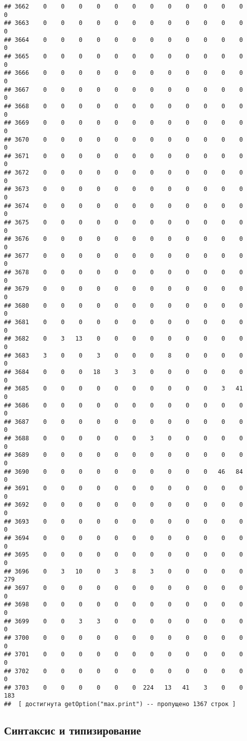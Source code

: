 \documentclass[]{article}
\begin{document}
\begin{verbatim}
## 3662    0    0    0    0    0    0    0    0    0    0    0    0    0
## 3663    0    0    0    0    0    0    0    0    0    0    0    0    0
## 3664    0    0    0    0    0    0    0    0    0    0    0    0    0
## 3665    0    0    0    0    0    0    0    0    0    0    0    0    0
## 3666    0    0    0    0    0    0    0    0    0    0    0    0    0
## 3667    0    0    0    0    0    0    0    0    0    0    0    0    0
## 3668    0    0    0    0    0    0    0    0    0    0    0    0    0
## 3669    0    0    0    0    0    0    0    0    0    0    0    0    0
## 3670    0    0    0    0    0    0    0    0    0    0    0    0    0
## 3671    0    0    0    0    0    0    0    0    0    0    0    0    0
## 3672    0    0    0    0    0    0    0    0    0    0    0    0    0
## 3673    0    0    0    0    0    0    0    0    0    0    0    0    0
## 3674    0    0    0    0    0    0    0    0    0    0    0    0    0
## 3675    0    0    0    0    0    0    0    0    0    0    0    0    0
## 3676    0    0    0    0    0    0    0    0    0    0    0    0    0
## 3677    0    0    0    0    0    0    0    0    0    0    0    0    0
## 3678    0    0    0    0    0    0    0    0    0    0    0    0    0
## 3679    0    0    0    0    0    0    0    0    0    0    0    0    0
## 3680    0    0    0    0    0    0    0    0    0    0    0    0    0
## 3681    0    0    0    0    0    0    0    0    0    0    0    0    0
## 3682    0    3   13    0    0    0    0    0    0    0    0    0    0
## 3683    3    0    0    3    0    0    0    8    0    0    0    0    0
## 3684    0    0    0   18    3    3    0    0    0    0    0    0    0
## 3685    0    0    0    0    0    0    0    0    0    0    3   41    0
## 3686    0    0    0    0    0    0    0    0    0    0    0    0    0
## 3687    0    0    0    0    0    0    0    0    0    0    0    0    0
## 3688    0    0    0    0    0    0    3    0    0    0    0    0    0
## 3689    0    0    0    0    0    0    0    0    0    0    0    0    0
## 3690    0    0    0    0    0    0    0    0    0    0   46   84    0
## 3691    0    0    0    0    0    0    0    0    0    0    0    0    0
## 3692    0    0    0    0    0    0    0    0    0    0    0    0    0
## 3693    0    0    0    0    0    0    0    0    0    0    0    0    0
## 3694    0    0    0    0    0    0    0    0    0    0    0    0    0
## 3695    0    0    0    0    0    0    0    0    0    0    0    0    0
## 3696    0    3   10    0    3    8    3    0    0    0    0    0  279
## 3697    0    0    0    0    0    0    0    0    0    0    0    0    0
## 3698    0    0    0    0    0    0    0    0    0    0    0    0    0
## 3699    0    0    3    3    0    0    0    0    0    0    0    0    0
## 3700    0    0    0    0    0    0    0    0    0    0    0    0    0
## 3701    0    0    0    0    0    0    0    0    0    0    0    0    0
## 3702    0    0    0    0    0    0    0    0    0    0    0    0    0
## 3703    0    0    0    0    0    0  224   13   41    3    0    0  183
##  [ достигнута getOption("max.print") -- пропущено 1367 строк ]
\end{verbatim}

\subsection{Синтаксис и типизирование}\label{--}
\end{document}
